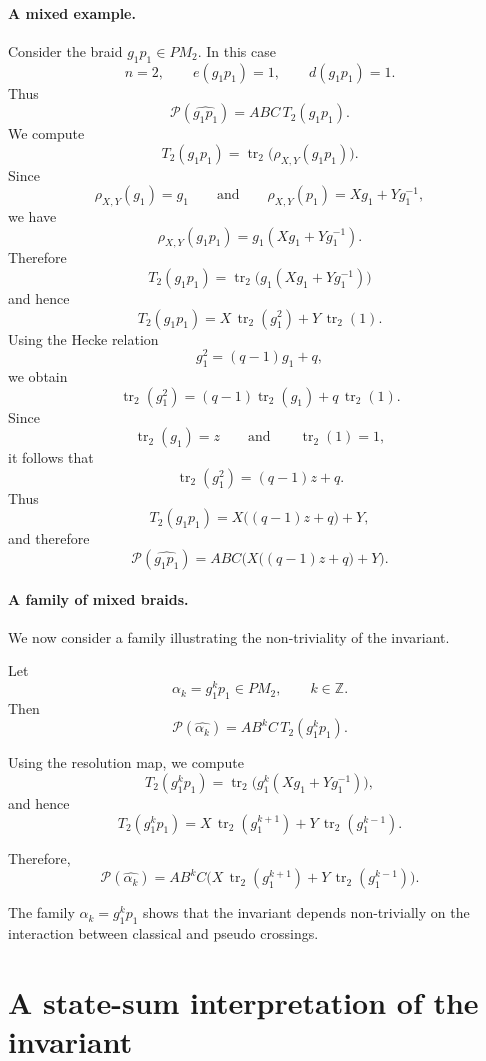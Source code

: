 \documentclass[11pt]{article}
\numberwithin{equation}{section}
\theoremstyle{definition}
\begin{document}
\paragraph{A mixed example.}
Consider the braid \(g_1p_1\in PM_2\). In this case
\[
n=2,\qquad e(g_1p_1)=1,\qquad d(g_1p_1)=1.
\]
Thus
\[
\mathcal P(\widehat{g_1p_1})
=
ABC\,T_2(g_1p_1).
\]
We compute
\[
T_2(g_1p_1)
=
\operatorname{tr}_2\big(\rho_{X,Y}(g_1p_1)\big).
\]
Since
\[
\rho_{X,Y}(g_1)=g_1
\qquad\text{and}\qquad
\rho_{X,Y}(p_1)=Xg_1+Yg_1^{-1},
\]
we have
\[
\rho_{X,Y}(g_1p_1)
=
g_1(Xg_1+Yg_1^{-1}).
\]
Therefore
\[
T_2(g_1p_1)
=
\operatorname{tr}_2\big(g_1(Xg_1+Yg_1^{-1})\big)
\]
and hence
\[
T_2(g_1p_1)
=
X\,\operatorname{tr}_2(g_1^2)
+
Y\,\operatorname{tr}_2(1).
\]
Using the Hecke relation
\[
g_1^2=(q-1)g_1+q,
\]
we obtain
\[
\operatorname{tr}_2(g_1^2)
=
(q-1)\operatorname{tr}_2(g_1)
+
q\,\operatorname{tr}_2(1).
\]
Since
\[
\operatorname{tr}_2(g_1)=z
\qquad\text{and}\qquad
\operatorname{tr}_2(1)=1,
\]
it follows that
\[
\operatorname{tr}_2(g_1^2)
=
(q-1)z+q.
\]
Thus
\[
T_2(g_1p_1)
=
X\big((q-1)z+q\big)+Y,
\]
and therefore
\[
\mathcal P(\widehat{g_1p_1})
=
ABC\Big(X\big((q-1)z+q\big)+Y\Big).
\]



\paragraph{A family of mixed braids.}
We now consider a family illustrating the non-triviality of the invariant.

Let
\[
\alpha_k = g_1^k p_1 \in PM_2,
\qquad k \in \mathbb{Z}.
\]
Then
\[
\mathcal P(\widehat{\alpha_k})
=
A B^k C\, T_2(g_1^k p_1).
\]

Using the resolution map, we compute
\[
T_2(g_1^k p_1)
=
\operatorname{tr}_2\big(g_1^k (X g_1 + Y g_1^{-1})\big),
\]
and hence
\[
T_2(g_1^k p_1)
=
X\,\operatorname{tr}_2(g_1^{k+1})
+
Y\,\operatorname{tr}_2(g_1^{k-1}).
\]

Therefore,
\[
\mathcal P(\widehat{\alpha_k})
=
A B^k C
\Big(
X\,\operatorname{tr}_2(g_1^{k+1})
+
Y\,\operatorname{tr}_2(g_1^{k-1})
\Big).
\]

The family \(\alpha_k = g_1^k p_1\) shows that the invariant depends non-trivially on the interaction between classical and pseudo crossings.




\section{A state-sum interpretation of the invariant}\label{statesum}
\end{document}
